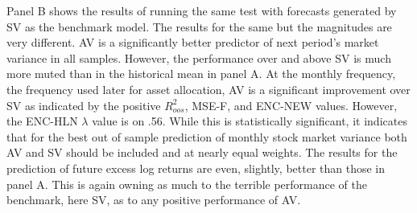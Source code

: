 Panel B shows the results of running the same test with forecasts generated by SV as the benchmark model. The results for the same but the magnitudes are very different. AV is a significantly better predictor of next period's market variance in all samples. However, the performance over and above SV is much more muted than in the historical mean in panel A. At the monthly frequency, the frequency used later for asset allocation, AV is a significant improvement over SV as indicated by the positive $R^{2}_{oos}$, MSE-F, and ENC-NEW values. However, the ENC-HLN $\lambda$ value is on .56. While this is statistically significant, it indicates that for the best out of sample prediction of monthly stock market variance both AV and SV should be included and at nearly equal weights. The results for the prediction of future excess log returns are even, slightly, better than those in panel A. This is again owning as much to the terrible performance of the benchmark, here SV, as to any positive performance of AV.